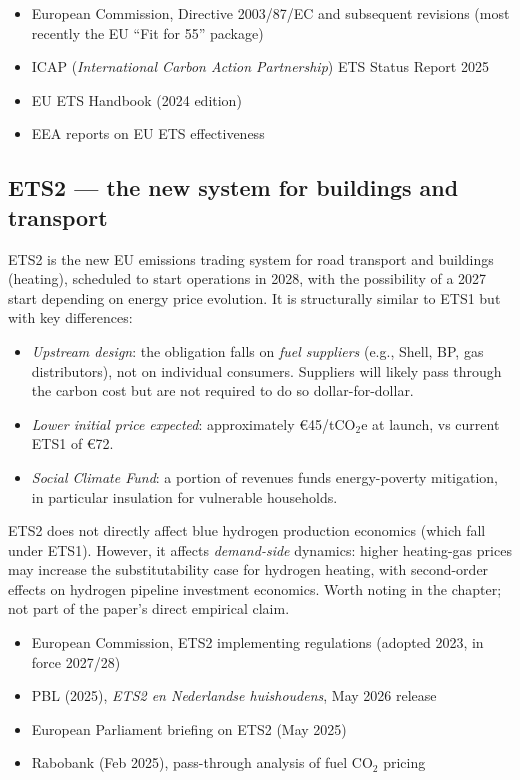 \documentclass[11pt,a4paper]{article}
\begin{document}
\begin{keysources}
\begin{itemize}
  \item European Commission, Directive 2003/87/EC and subsequent revisions (most recently the EU ``Fit for 55'' package)
  \item ICAP (\emph{International Carbon Action Partnership}) ETS Status Report 2025
  \item EU ETS Handbook (2024 edition)
  \item EEA reports on EU ETS effectiveness
\end{itemize}
\end{keysources}

\subsection{ETS2 --- the new system for buildings and transport}

ETS2 is the new EU emissions trading system for road transport and buildings (heating), scheduled to start operations in 2028, with the possibility of a 2027 start depending on energy price evolution. It is structurally similar to ETS1 but with key differences:

\begin{itemize}
  \item \emph{Upstream design}: the obligation falls on \emph{fuel suppliers} (e.g., Shell, BP, gas distributors), not on individual consumers. Suppliers will likely pass through the carbon cost but are not required to do so dollar-for-dollar.
  \item \emph{Lower initial price expected}: approximately \euro 45/tCO$_2$e at launch, vs current ETS1 of \euro 72.
  \item \emph{Social Climate Fund}: a portion of revenues funds energy-poverty mitigation, in particular insulation for vulnerable households.
\end{itemize}

\begin{technote}
ETS2 does not directly affect blue hydrogen production economics (which fall under ETS1). However, it affects \emph{demand-side} dynamics: higher heating-gas prices may increase the substitutability case for hydrogen heating, with second-order effects on hydrogen pipeline investment economics. Worth noting in the chapter; not part of the paper's direct empirical claim.
\end{technote}

\begin{keysources}
\begin{itemize}
  \item European Commission, ETS2 implementing regulations (adopted 2023, in force 2027/28)
  \item PBL (2025), \emph{ETS2 en Nederlandse huishoudens}, May 2026 release
  \item European Parliament briefing on ETS2 (May 2025)
  \item Rabobank (Feb 2025), pass-through analysis of fuel CO$_2$ pricing
\end{itemize}
\end{keysources}
\end{document}
